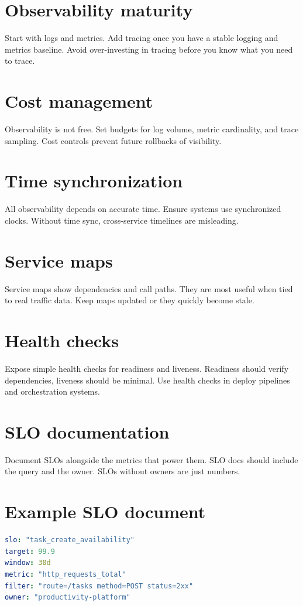 \section{Observability maturity}
Start with logs and metrics.
Add tracing once you have a stable logging and metrics baseline.
Avoid over-investing in tracing before you know what you need to trace.

\section{Cost management}
Observability is not free.
Set budgets for log volume, metric cardinality, and trace sampling.
Cost controls prevent future rollbacks of visibility.

\section{Time synchronization}
All observability depends on accurate time.
Ensure systems use synchronized clocks.
Without time sync, cross-service timelines are misleading.

\section{Service maps}
Service maps show dependencies and call paths.
They are most useful when tied to real traffic data.
Keep maps updated or they quickly become stale.

\section{Health checks}
Expose simple health checks for readiness and liveness.
Readiness should verify dependencies, liveness should be minimal.
Use health checks in deploy pipelines and orchestration systems.

\section{SLO documentation}
Document SLOs alongside the metrics that power them.
SLO docs should include the query and the owner.
SLOs without owners are just numbers.

\section{Example SLO document}
\begin{lstlisting}[language=YAML]
slo: "task_create_availability"
target: 99.9
window: 30d
metric: "http_requests_total"
filter: "route=/tasks method=POST status=2xx"
owner: "productivity-platform"
\end{lstlisting}


